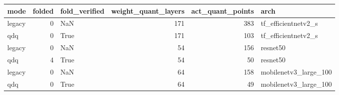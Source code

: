 \begin{tabular}{lrlrrl}
\toprule
mode & folded & fold\_verified & weight\_quant\_layers & act\_quant\_points & arch \\
\midrule
legacy & 0 & NaN & 171 & 383 & tf\_efficientnetv2\_s \\
qdq & 0 & True & 171 & 103 & tf\_efficientnetv2\_s \\
legacy & 0 & NaN & 54 & 156 & resnet50 \\
qdq & 4 & True & 54 & 50 & resnet50 \\
legacy & 0 & NaN & 64 & 158 & mobilenetv3\_large\_100 \\
qdq & 0 & True & 64 & 49 & mobilenetv3\_large\_100 \\
\bottomrule
\end{tabular}
